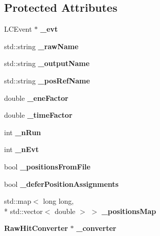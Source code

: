 \subsection*{Protected Attributes}
\begin{DoxyCompactItemize}
\item 
L\-C\-Event $\ast$ {\bfseries \-\_\-evt}\label{classdigisim_1_1CalorimeterHitsProcessor_a4ea90da4b6e3c1d305027db644f8bb37}

\item 
std\-::string {\bfseries \-\_\-raw\-Name}\label{classdigisim_1_1CalorimeterHitsProcessor_a48525e77a89f66bb493fb14c0b28b475}

\item 
std\-::string {\bfseries \-\_\-output\-Name}\label{classdigisim_1_1CalorimeterHitsProcessor_a05771a12d33a36e49d65bc2303617003}

\item 
std\-::string {\bfseries \-\_\-pos\-Ref\-Name}\label{classdigisim_1_1CalorimeterHitsProcessor_a58758649ca1a759f27663b986085be32}

\item 
double {\bfseries \-\_\-ene\-Factor}\label{classdigisim_1_1CalorimeterHitsProcessor_af275a3b7cf25f25719d050595e421fdf}

\item 
double {\bfseries \-\_\-time\-Factor}\label{classdigisim_1_1CalorimeterHitsProcessor_a2987fffdc3d1ca312fef905f5073aa27}

\item 
int {\bfseries \-\_\-n\-Run}\label{classdigisim_1_1CalorimeterHitsProcessor_a3e43e1cd745608ee10c113c25d60c44b}

\item 
int {\bfseries \-\_\-n\-Evt}\label{classdigisim_1_1CalorimeterHitsProcessor_a861f268ec460f2ab7658971738c3b672}

\item 
bool {\bfseries \-\_\-positions\-From\-File}\label{classdigisim_1_1CalorimeterHitsProcessor_a87e4b7b02c9627fe7816b9c5b8eb9c59}

\item 
bool {\bfseries \-\_\-defer\-Position\-Assignments}\label{classdigisim_1_1CalorimeterHitsProcessor_ad9c012c16278fdf4d7585addf8a017e4}

\item 
std\-::map$<$ long long, \\*
std\-::vector$<$ double $>$ $>$ {\bfseries \-\_\-positions\-Map}\label{classdigisim_1_1CalorimeterHitsProcessor_a12d9128f4082932e8fdb1ad9d6a71201}

\item 
{\bf Raw\-Hit\-Converter} $\ast$ {\bfseries \-\_\-converter}\label{classdigisim_1_1CalorimeterHitsProcessor_a9a52fc987bf426d6756a73541f09116c}

\end{DoxyCompactItemize}
